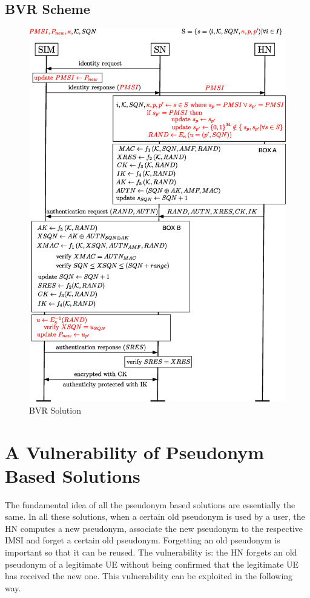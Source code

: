 \documentclass{llncs} %
\begin{document}
\subsection{BVR Scheme}
\begin{figure}[]
  \centering
    \includegraphics[width=\textwidth]{BVR.eps}
  \caption{BVR Solution}
  \label{fig:bvr_solution}	
\end{figure}


\section{A Vulnerability of Pseudonym Based Solutions} \label{sec:vulnerability}
The fundamental idea of all the pseudonym based solutions \cite{CCS15,SSR15,Ginzboorg_Niemi_2016,Norrman_Naslund_Dubrova_2016} are essentially the same. In all these solutions, when a certain old pseudonym is used by a user, the HN computes a new pseudonym, associate the new pseudonym to the respective IMSI and forget a certain old pseudonym. Forgetting an old pseudonym is important so that it can be reused. The vulnerability is: the HN forgets an old pseudonym of a legitimate UE without being confirmed that the legitimate UE has received the new one. This vulnerability can be exploited in the following way. 
\end{document}
